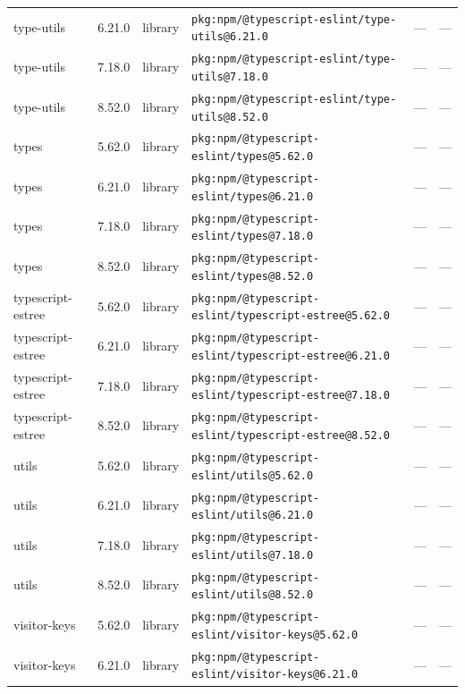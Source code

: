 \documentclass[11pt,a4paper]{article}
\begin{document}
\begin{longtable}{|p{4cm}|p{2cm}|p{1.6cm}|p{5cm}|p{1.5cm}|p{3.5cm}|}
\raggedright type-utils & 6.21.0 & library & \small\texttt{pkg:npm/@typescript-eslint/type-utils@6.21.0} & — & \small — \\
\raggedright type-utils & 7.18.0 & library & \small\texttt{pkg:npm/@typescript-eslint/type-utils@7.18.0} & — & \small — \\
\raggedright type-utils & 8.52.0 & library & \small\texttt{pkg:npm/@typescript-eslint/type-utils@8.52.0} & — & \small — \\
\raggedright types & 5.62.0 & library & \small\texttt{pkg:npm/@typescript-eslint/types@5.62.0} & — & \small — \\
\raggedright types & 6.21.0 & library & \small\texttt{pkg:npm/@typescript-eslint/types@6.21.0} & — & \small — \\
\raggedright types & 7.18.0 & library & \small\texttt{pkg:npm/@typescript-eslint/types@7.18.0} & — & \small — \\
\raggedright types & 8.52.0 & library & \small\texttt{pkg:npm/@typescript-eslint/types@8.52.0} & — & \small — \\
\raggedright typescript-estree & 5.62.0 & library & \small\texttt{pkg:npm/@typescript-eslint/typescript-estree@5.62.0} & — & \small — \\
\raggedright typescript-estree & 6.21.0 & library & \small\texttt{pkg:npm/@typescript-eslint/typescript-estree@6.21.0} & — & \small — \\
\raggedright typescript-estree & 7.18.0 & library & \small\texttt{pkg:npm/@typescript-eslint/typescript-estree@7.18.0} & — & \small — \\
\raggedright typescript-estree & 8.52.0 & library & \small\texttt{pkg:npm/@typescript-eslint/typescript-estree@8.52.0} & — & \small — \\
\raggedright utils & 5.62.0 & library & \small\texttt{pkg:npm/@typescript-eslint/utils@5.62.0} & — & \small — \\
\raggedright utils & 6.21.0 & library & \small\texttt{pkg:npm/@typescript-eslint/utils@6.21.0} & — & \small — \\
\raggedright utils & 7.18.0 & library & \small\texttt{pkg:npm/@typescript-eslint/utils@7.18.0} & — & \small — \\
\raggedright utils & 8.52.0 & library & \small\texttt{pkg:npm/@typescript-eslint/utils@8.52.0} & — & \small — \\
\raggedright visitor-keys & 5.62.0 & library & \small\texttt{pkg:npm/@typescript-eslint/visitor-keys@5.62.0} & — & \small — \\
\raggedright visitor-keys & 6.21.0 & library & \small\texttt{pkg:npm/@typescript-eslint/visitor-keys@6.21.0} & — & \small — \\

\end{longtable}
\end{document}
